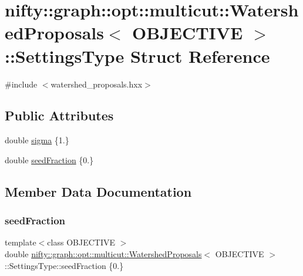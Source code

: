 \hypertarget{structnifty_1_1graph_1_1opt_1_1multicut_1_1WatershedProposals_1_1SettingsType}{}\section{nifty\+:\+:graph\+:\+:opt\+:\+:multicut\+:\+:Watershed\+Proposals$<$ O\+B\+J\+E\+C\+T\+I\+VE $>$\+:\+:Settings\+Type Struct Reference}
\label{structnifty_1_1graph_1_1opt_1_1multicut_1_1WatershedProposals_1_1SettingsType}


{\ttfamily \#include $<$watershed\+\_\+proposals.\+hxx$>$}

\subsection*{Public Attributes}
\begin{DoxyCompactItemize}
\item 
double \hyperlink{structnifty_1_1graph_1_1opt_1_1multicut_1_1WatershedProposals_1_1SettingsType_af51562f48c898c74ae4f15b2d3c239ec}{sigma} \{1.\}
\item 
double \hyperlink{structnifty_1_1graph_1_1opt_1_1multicut_1_1WatershedProposals_1_1SettingsType_af9d2c2d7871b3086a65598751225fd0c}{seed\+Fraction} \{0.\}
\end{DoxyCompactItemize}


\subsection{Member Data Documentation}
\mbox{\label{structnifty_1_1graph_1_1opt_1_1multicut_1_1WatershedProposals_1_1SettingsType_af9d2c2d7871b3086a65598751225fd0c}} 
\subsubsection{\texorpdfstring{seed\+Fraction}{seedFraction}}
{\footnotesize\ttfamily template$<$class O\+B\+J\+E\+C\+T\+I\+VE $>$ \\
double \hyperlink{classnifty_1_1graph_1_1opt_1_1multicut_1_1WatershedProposals}{nifty\+::graph\+::opt\+::multicut\+::\+Watershed\+Proposals}$<$ O\+B\+J\+E\+C\+T\+I\+VE $>$\+::Settings\+Type\+::seed\+Fraction \{0.\}}

